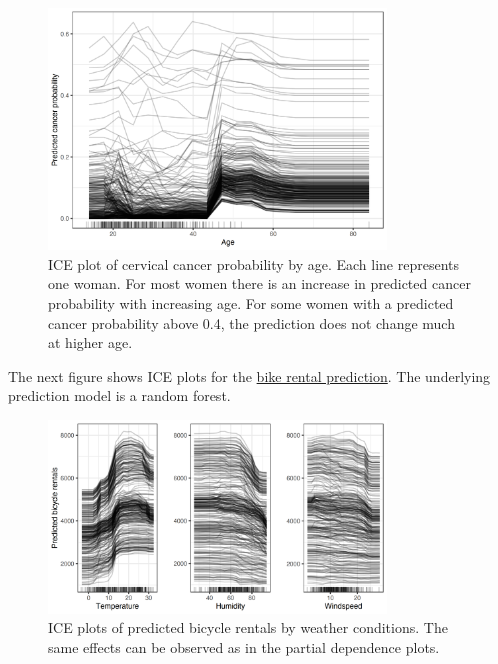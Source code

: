 \documentclass[
  11pt,
]{scrbook}
\begin{document}
\begin{figure}

{\centering \includegraphics[width=0.8\textwidth]{images/ice-cervical-1} 

}

\caption{ICE plot of cervical cancer probability by age. Each line represents one woman. For most women there is an increase in predicted cancer probability with increasing age. For some women with a predicted cancer probability above 0.4, the prediction does not change much at higher age.}\label{fig:ice-cervical}
\end{figure}

The next figure shows ICE plots for the \protect\hyperlink{bike-data}{bike rental prediction}.
The underlying prediction model is a random forest.

\begin{figure}

{\centering \includegraphics[width=0.8\textwidth]{images/ice-bike-1} 

}

\caption{ICE plots of predicted bicycle rentals by weather conditions. The same effects can be observed as in the partial dependence plots.}\label{fig:ice-bike}
\end{figure}
\end{document}
